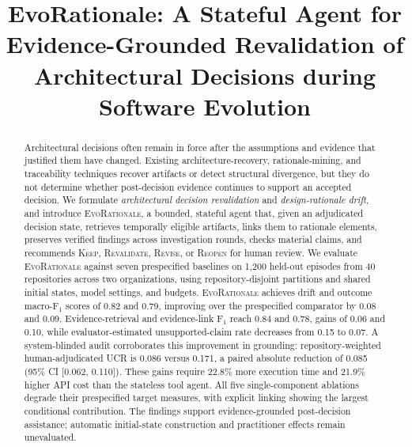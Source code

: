 \documentclass[10pt,conference]{IEEEtran}
\begin{document}
\title{EvoRationale: A Stateful Agent for Evidence-Grounded
Revalidation of Architectural Decisions during Software Evolution}

\author{}

\maketitle


\begin{abstract}
Architectural decisions often remain in force after the assumptions and evidence that justified them have changed. Existing architecture-recovery, rationale-mining, and traceability techniques recover artifacts or detect structural divergence, but they do not determine whether post-decision evidence continues to support an accepted decision. We formulate \emph{architectural decision revalidation} and \emph{design-rationale drift}, and introduce \textsc{EvoRationale}, a bounded, stateful agent that, given an adjudicated decision state, retrieves temporally eligible artifacts, links them to rationale elements, preserves verified findings across investigation rounds, checks material claims, and recommends \textsc{Keep}, \textsc{Revalidate}, \textsc{Revise}, or \textsc{Reopen} for human review. We evaluate \textsc{EvoRationale} against seven prespecified baselines on 1,200 held-out episodes from 40 repositories across two organizations, using repository-disjoint partitions and shared initial states, model settings, and budgets. \textsc{EvoRationale} achieves drift and outcome macro-F$_1$ scores of 0.82 and 0.79, improving over the prespecified comparator by 0.08 and 0.09. Evidence-retrieval and evidence-link F$_1$ reach 0.84 and 0.78, gains of 0.06 and 0.10, while evaluator-estimated unsupported-claim rate decreases from 0.15 to 0.07. A system-blinded audit corroborates this improvement in grounding: repository-weighted human-adjudicated UCR is 0.086 versus 0.171, a paired absolute reduction of 0.085 (95\% CI [0.062, 0.110]). These gains require 22.8\% more execution time and 21.9\% higher API cost than the stateless tool agent. All five single-component ablations degrade their prespecified target measures, with explicit linking showing the largest conditional contribution. The findings support evidence-grounded post-decision assistance; automatic initial-state construction and practitioner effects remain unevaluated.
\end{abstract}
\end{document}
